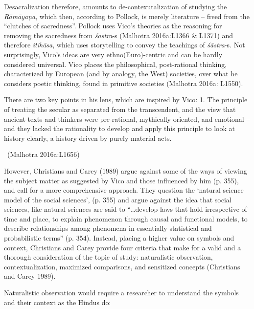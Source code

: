 Desacralization therefore, amounts to de-contexutalization of studying the \textit{Rāmāyaṇa}, which then, according to Pollock, is merely literature – freed from the “clutches of sacredness”. Pollock uses Vico’s theories as the reasoning for removing the sacredness from \textit{śāstra}-s (Malhotra 2016a:L1366 \& L1371) and therefore \textit{itihāsa}, which uses storytelling to convey the teachings of \textit{śāstra}-s. Not surprisingly, Vico’s ideas are very ethno(Euro)-centric and can be hardly considered universal. Vico places the philosophical, post-rational thinking, characterized by European (and by analogy, the West) societies, over what he considers poetic thinking, found in primitive societies (Malhotra 2016a: L1550).

\begin{myquote}
There are two key points in his lens, which are inspired by Vico: 1. The principle of treating the secular as separated from the transcendent, and the view that ancient texts and thinkers were pre-rational, mythically oriented, and emotional – and they lacked the rationality to develop and apply this principle to look at history clearly, a history driven by purely material acts. 

~\hfill (Malhotra 2016a:L1656)
\end{myquote}

However, Christians and Carey (1989) argue against some of the ways of viewing the subject matter as suggested by Vico and those influenced by him (p. 355), and call for a more comprehensive approach. They question the ‘natural science model of the social sciences’, (p. 355) and argue against the idea that social sciences, like natural sciences are said to “…develop laws that hold irrespective of time and place, to explain phenomenon through causal and functional models, to describe relationships among phenomena in essentially statistical and probabilistic terms” (p. 354). Instead, placing a higher value on symbols and context, Christians and Carey provide four criteria that make for a valid and a thorough consideration of the topic of study: naturalistic observation, contextualization, maximized comparisons, and sensitized concepts (Christians and Carey 1989).

Naturalistic observation would require a researcher to understand the symbols and their context as the Hindus do:

